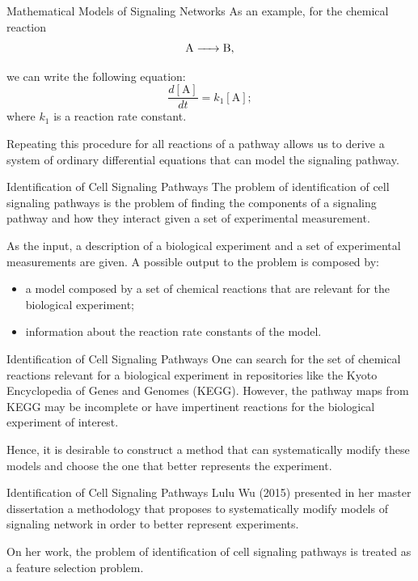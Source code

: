 \documentclass{beamer}
\begin{document}
\begin{frame}{Mathematical Models of Signaling Networks}
As an example, for the chemical reaction
\begin{equation*}
\ce{
    A -> B
},
\end{equation*}

\pause
we can write the following equation:
\begin{equation*}
        \frac{d[\text{A}]}{dt} = k_1[\text{A}]; 
\end{equation*}
where $k_1$ is a reaction rate constant.

\pause
Repeating this procedure for all reactions of a pathway allows us to 
derive a system of ordinary differential equations that can model the 
signaling pathway.
\end{frame}


\begin{frame}{Identification of Cell Signaling Pathways}
The problem of identification of cell signaling pathways is the problem
of finding the components of a signaling pathway and how they interact
given a set of experimental measurement.

\pause
As the input, a description of a biological experiment and a set of 
experimental measurements are given. \pause A possible output to the 
problem is composed by:
\begin{itemize}
    \pause
    \item{a model composed by a set of chemical reactions that are 
        relevant for the biological experiment;}
    \pause
    \item{information about the reaction rate constants of the model.}
\end{itemize}
\end{frame}


\begin{frame}{Identification of Cell Signaling Pathways}
One can search for the set of chemical reactions relevant for a 
biological experiment in repositories like the Kyoto Encyclopedia of 
Genes and Genomes (KEGG). \pause However, the pathway maps from KEGG may
be incomplete or have impertinent reactions for the biological 
experiment of interest.
\pause

Hence, it is desirable to construct a method that can systematically 
modify these models and choose the one that better represents the 
experiment.
\end{frame}


\begin{frame}{Identification of Cell Signaling Pathways}
Lulu Wu (2015) presented in her master dissertation a methodology that 
proposes to systematically modify models of signaling network in order
to better represent experiments.
\pause

On her work, the problem of identification of cell signaling pathways is
treated as a feature selection problem.
\end{frame}
\end{document}
